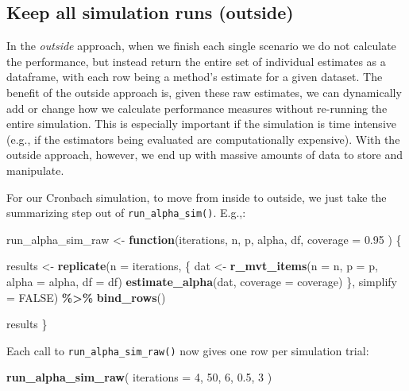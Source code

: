 \documentclass[
]{book}
\newenvironment{Shaded}{\begin{snugshade}}{\end{snugshade}}
\newcommand{\AttributeTok}[1]{\textcolor[rgb]{0.13,0.29,0.53}{#1}}
\newcommand{\ConstantTok}[1]{\textcolor[rgb]{0.56,0.35,0.01}{#1}}
\newcommand{\ControlFlowTok}[1]{\textcolor[rgb]{0.13,0.29,0.53}{\textbf{#1}}}
\newcommand{\DecValTok}[1]{\textcolor[rgb]{0.00,0.00,0.81}{#1}}
\newcommand{\FloatTok}[1]{\textcolor[rgb]{0.00,0.00,0.81}{#1}}
\newcommand{\FunctionTok}[1]{\textcolor[rgb]{0.13,0.29,0.53}{\textbf{#1}}}
\newcommand{\NormalTok}[1]{#1}
\newcommand{\OtherTok}[1]{\textcolor[rgb]{0.56,0.35,0.01}{#1}}
\newcommand{\SpecialCharTok}[1]{\textcolor[rgb]{0.81,0.36,0.00}{\textbf{#1}}}
\begin{document}
\subsection{Keep all simulation runs (outside)}\label{keep-all-simulation-runs-outside}

In the \emph{outside} approach, when we finish each single scenario we do not calculate the performance, but instead return the entire set of individual estimates as a dataframe, with each row being a method's estimate for a given dataset.
The benefit of the outside approach is, given these raw estimates, we can dynamically add or change how we calculate performance measures without re-running the entire simulation.
This is especially important if the simulation is time intensive (e.g., if the estimators being evaluated are computationally expensive).
With the outside approach, however, we end up with massive amounts of data to store and manipulate.

For our Cronbach simulation, to move from inside to outside, we just take the summarizing step out of \texttt{run\_alpha\_sim()}.
E.g.,:

\begin{Shaded}
\begin{Highlighting}[]
\NormalTok{run\_alpha\_sim\_raw }\OtherTok{\textless{}{-}} \ControlFlowTok{function}\NormalTok{(iterations, n, p, alpha, df, }\AttributeTok{coverage =} \FloatTok{0.95}\NormalTok{ ) \{}
  
\NormalTok{  results }\OtherTok{\textless{}{-}} 
    \FunctionTok{replicate}\NormalTok{(}\AttributeTok{n =}\NormalTok{ iterations, \{}
\NormalTok{      dat }\OtherTok{\textless{}{-}} \FunctionTok{r\_mvt\_items}\NormalTok{(}\AttributeTok{n =}\NormalTok{ n, }\AttributeTok{p =}\NormalTok{ p, }\AttributeTok{alpha =}\NormalTok{ alpha, }\AttributeTok{df =}\NormalTok{ df)}
      \FunctionTok{estimate\_alpha}\NormalTok{(dat, }\AttributeTok{coverage =}\NormalTok{ coverage)}
\NormalTok{    \}, }\AttributeTok{simplify =} \ConstantTok{FALSE}\NormalTok{) }\SpecialCharTok{\%\textgreater{}\%}
    \FunctionTok{bind\_rows}\NormalTok{()}
  
\NormalTok{  results}
\NormalTok{\}}
\end{Highlighting}
\end{Shaded}

Each call to \texttt{run\_alpha\_sim\_raw()} now gives one row per simulation trial:

\begin{Shaded}
\begin{Highlighting}[]
\FunctionTok{run\_alpha\_sim\_raw}\NormalTok{( }\AttributeTok{iterations =} \DecValTok{4}\NormalTok{, }
                   \DecValTok{50}\NormalTok{, }\DecValTok{6}\NormalTok{, }\FloatTok{0.5}\NormalTok{, }\DecValTok{3}\NormalTok{ )}
\end{Highlighting}
\end{Shaded}
\end{document}
